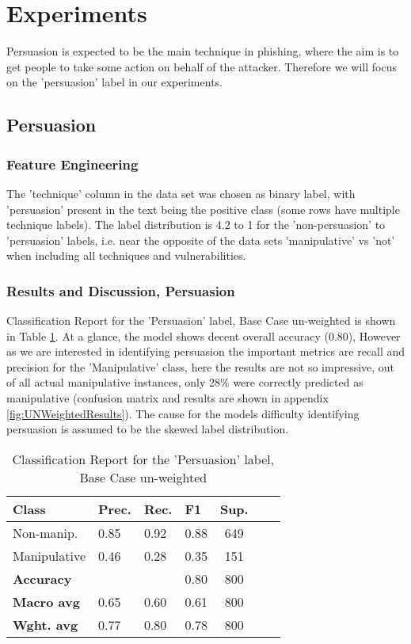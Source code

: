 \documentclass[
	letterpaper, %
	12pt, %
	unnumberedsections, %
	twoside, %
]{LTJournalArticle}
\begin{document}
\section{Experiments}
Persuasion is expected to be the main technique in phishing, where the aim is to get people to take some action on behalf of the attacker. Therefore we will focus on the 'persuasion' label in our experiments.

\subsection{Persuasion}
\subsubsection{Feature Engineering}
The 'technique' column in the data set was chosen as binary label, with 'persuasion' present in the text being the positive class (some rows have multiple technique labels). The label distribution is 4.2 to 1 for the 'non-persuasion' to 'persuasion' labels, i.e. near the opposite of the data sets 'manipulative' vs 'not' when including all techniques and vulnerabilities.

\subsubsection{Results and Discussion, Persuasion}
Classification Report for the 'Persuasion' label, Base Case un-weighted is shown in Table \ref{tab:BaseCasePersuasionReport}. At a glance, the model shows decent overall accuracy (0.80), However as we are interested in identifying persuasion the important metrics are recall and precision for the 'Manipulative' class, here the results are not so impressive, out of all actual manipulative instances, only 28\% were correctly predicted as manipulative (confusion matrix and results are shown in appendix \ref{fig:UNWeightedResults}). The cause for the models difficulty identifying persuasion is assumed to be the skewed label distribution.

\begin{table}[h!]
	\small
	\centering
	\begin{tabular}{|p{2.2cm}|p{1cm}|p{1cm}|p{1cm}|c|c|c|}
		\hline
		\textbf{Class}     & \textbf{Prec.} & \textbf{Rec.} & \textbf{F1} & \textbf{Sup.} \\
		\hline
		Non-manip.         & 0.85           & 0.92          & 0.88        & 649           \\
		\hline
		Manipulative       & 0.46           & 0.28          & 0.35        & 151           \\
		\hline
		\hline
		\textbf{Accuracy}  &                &               & 0.80        & 800           \\
		\hline
		\textbf{Macro avg} & 0.65           & 0.60          & 0.61        & 800           \\
		\hline
		\textbf{Wght. avg} & 0.77           & 0.80          & 0.78        & 800           \\
		\hline
	\end{tabular}
	\caption{Classification Report for the 'Persuasion' label, Base Case un-weighted}
	\label{tab:BaseCasePersuasionReport}
\end{table}
\end{document}
